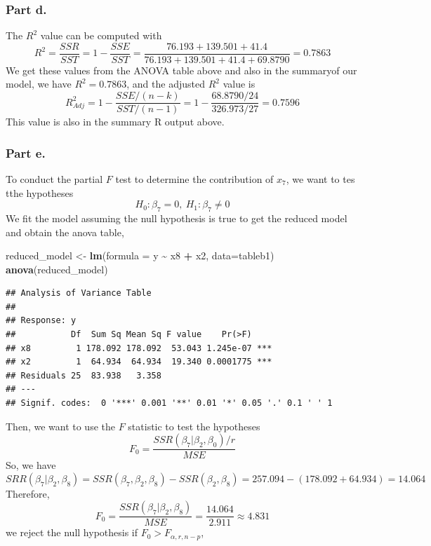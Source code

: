 \documentclass[
  11pt,
]{article}
\newenvironment{Shaded}{\begin{snugshade}}{\end{snugshade}}
\newcommand{\AttributeTok}[1]{\textcolor[rgb]{0.13,0.29,0.53}{#1}}
\newcommand{\FunctionTok}[1]{\textcolor[rgb]{0.13,0.29,0.53}{\textbf{#1}}}
\newcommand{\NormalTok}[1]{#1}
\newcommand{\OtherTok}[1]{\textcolor[rgb]{0.56,0.35,0.01}{#1}}
\newcommand{\SpecialCharTok}[1]{\textcolor[rgb]{0.81,0.36,0.00}{\textbf{#1}}}
\begin{document}
\subsubsection{Part d.~}\label{part-d.-1}

The \(R^2\) value can be computed with
\[R^2 = \frac{SSR}{SST} = 1 - \frac{SSE}{SST} = \frac{76.193 + 139.501 + 41.4}{76.193 + 139.501 + 41.4 + 69.8790} = 0.7863\]
We get these values from the ANOVA table above and also in the summaryof
our model, we have \(R^2 =0.7863\), and the adjusted \(R^2\) value is
\[R^2_{Adj} = 1 - \frac{SSE/(n-k)}{SST/(n-1)} = 1 - \frac{68.8790/24}{326.973/27} = 0.7596\]
This value is also in the summary R output above.

\subsubsection{Part e.}\label{part-e.}

To conduct the partial \(F\) test to determine the contribution of
\(x_7\), we want to tes tthe hypotheses
\[H_0: \beta_7 = 0, \ H_1: \beta_7 \neq 0\] We fit the model assuming
the null hypothesis is true to get the reduced model and obtain the
anova table,

\begin{Shaded}
\begin{Highlighting}[]
\NormalTok{reduced\_model }\OtherTok{\textless{}{-}} \FunctionTok{lm}\NormalTok{(}\AttributeTok{formula =}\NormalTok{ y }\SpecialCharTok{\textasciitilde{}}\NormalTok{ x8 }\SpecialCharTok{+}\NormalTok{ x2, }\AttributeTok{data=}\NormalTok{tableb1)}
\FunctionTok{anova}\NormalTok{(reduced\_model)}
\end{Highlighting}
\end{Shaded}

\begin{verbatim}
## Analysis of Variance Table
## 
## Response: y
##           Df  Sum Sq Mean Sq F value    Pr(>F)    
## x8         1 178.092 178.092  53.043 1.245e-07 ***
## x2         1  64.934  64.934  19.340 0.0001775 ***
## Residuals 25  83.938   3.358                      
## ---
## Signif. codes:  0 '***' 0.001 '**' 0.01 '*' 0.05 '.' 0.1 ' ' 1
\end{verbatim}

Then, we want to use the \(F\) statistic to test the hypotheses
\[F_0 = \frac{SSR(\beta_7| \beta_2, \beta_0)/r}{MSE}\] So, we have
\[SRR(\beta_7|\beta_2, \beta_8) = SSR(\beta_7,\beta_2,\beta_8) - SSR(\beta_2, \beta_8) = 257.094 - (178.092 + 64.934) = 14.064\]
Therefore,
\[F_0 = \frac{SSR(\beta_7| \beta_2, \beta_8)}{MSE} = \frac{14.064}{2.911} \approx 4.831\]
we reject the null hypothesis if \(F_0 > F_{\alpha, r, n-p}\),
\end{document}

